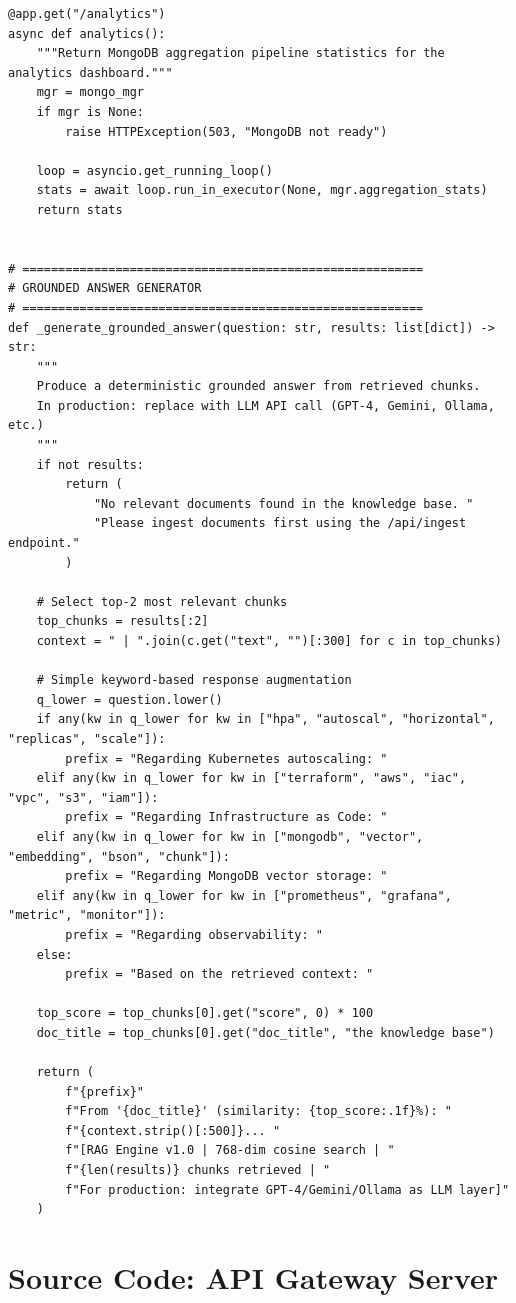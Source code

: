 \documentclass[12pt,a4paper]{report}
\begin{document}
\begin{lstlisting}
@app.get("/analytics")
async def analytics():
    """Return MongoDB aggregation pipeline statistics for the analytics dashboard."""
    mgr = mongo_mgr
    if mgr is None:
        raise HTTPException(503, "MongoDB not ready")

    loop = asyncio.get_running_loop()
    stats = await loop.run_in_executor(None, mgr.aggregation_stats)
    return stats


# ========================================================
# GROUNDED ANSWER GENERATOR
# ========================================================
def _generate_grounded_answer(question: str, results: list[dict]) -> str:
    """
    Produce a deterministic grounded answer from retrieved chunks.
    In production: replace with LLM API call (GPT-4, Gemini, Ollama, etc.)
    """
    if not results:
        return (
            "No relevant documents found in the knowledge base. "
            "Please ingest documents first using the /api/ingest endpoint."
        )

    # Select top-2 most relevant chunks
    top_chunks = results[:2]
    context = " | ".join(c.get("text", "")[:300] for c in top_chunks)

    # Simple keyword-based response augmentation
    q_lower = question.lower()
    if any(kw in q_lower for kw in ["hpa", "autoscal", "horizontal", "replicas", "scale"]):
        prefix = "Regarding Kubernetes autoscaling: "
    elif any(kw in q_lower for kw in ["terraform", "aws", "iac", "vpc", "s3", "iam"]):
        prefix = "Regarding Infrastructure as Code: "
    elif any(kw in q_lower for kw in ["mongodb", "vector", "embedding", "bson", "chunk"]):
        prefix = "Regarding MongoDB vector storage: "
    elif any(kw in q_lower for kw in ["prometheus", "grafana", "metric", "monitor"]):
        prefix = "Regarding observability: "
    else:
        prefix = "Based on the retrieved context: "

    top_score = top_chunks[0].get("score", 0) * 100
    doc_title = top_chunks[0].get("doc_title", "the knowledge base")

    return (
        f"{prefix}"
        f"From '{doc_title}' (similarity: {top_score:.1f}%): "
        f"{context.strip()[:500]}... "
        f"[RAG Engine v1.0 | 768-dim cosine search | "
        f"{len(results)} chunks retrieved | "
        f"For production: integrate GPT-4/Gemini/Ollama as LLM layer]"
    )
\end{lstlisting}

\section{Source Code: API Gateway Server}
\end{document}
